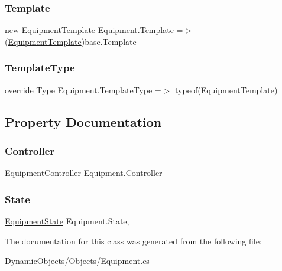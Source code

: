 \mbox{\label{class_equipment_a691c8de53afa564d0b1a0f1adb0978b7}} 
\subsubsection{\texorpdfstring{Template}{Template}}
{\footnotesize\ttfamily new \mbox{\hyperlink{class_equipment_template}{Equipment\+Template}} Equipment.\+Template =$>$ (\mbox{\hyperlink{class_equipment_template}{Equipment\+Template}})base.\+Template}

\mbox{\label{class_equipment_a6058f9d92aff36decfed5b34776aebb4}} 
\subsubsection{\texorpdfstring{Template\+Type}{TemplateType}}
{\footnotesize\ttfamily override Type Equipment.\+Template\+Type =$>$ typeof(\mbox{\hyperlink{class_equipment_template}{Equipment\+Template}})\hspace{0.3cm}{\ttfamily [protected]}}



\subsection{Property Documentation}
\mbox{\label{class_equipment_ac684d7d827057b05d24be2fc46bac14d}} 
\subsubsection{\texorpdfstring{Controller}{Controller}}
{\footnotesize\ttfamily \mbox{\hyperlink{class_equipment_controller}{Equipment\+Controller}} Equipment.\+Controller\hspace{0.3cm}{\ttfamily [get]}}

\mbox{\label{class_equipment_a90acccabae34547f69244d203cecdaf0}} 
\subsubsection{\texorpdfstring{State}{State}}
{\footnotesize\ttfamily \mbox{\hyperlink{class_equipment_a8b3877398e5be5b420818b99ad7f0bca}{Equipment\+State}} Equipment.\+State\hspace{0.3cm}{\ttfamily [get]}, {\ttfamily [set]}}



The documentation for this class was generated from the following file\+:\begin{DoxyCompactItemize}
\item 
Dynamic\+Objects/\+Objects/\mbox{\hyperlink{_equipment_8cs}{Equipment.\+cs}}\end{DoxyCompactItemize}
